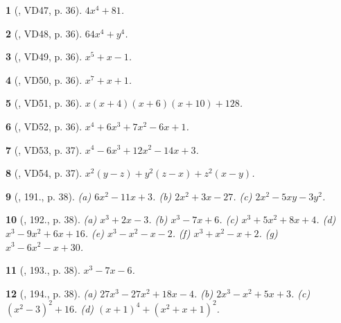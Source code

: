 \documentclass{article}
\newtheorem{baitoan}{}
\begin{document}
\begin{baitoan}[\cite{Binh_Toan_8_tap_1}, VD47, p. 36]
	$4x^4 + 81$.
\end{baitoan}

\begin{baitoan}[\cite{Binh_Toan_8_tap_1}, VD48, p. 36]
	$64x^4 + y^4$.
\end{baitoan}

\begin{baitoan}[\cite{Binh_Toan_8_tap_1}, VD49, p. 36]
	$x^5 + x - 1$.
\end{baitoan}

\begin{baitoan}[\cite{Binh_Toan_8_tap_1}, VD50, p. 36]
	$x^7 + x + 1$.
\end{baitoan}

\begin{baitoan}[\cite{Binh_Toan_8_tap_1}, VD51, p. 36]
	$x(x + 4)(x + 6)(x + 10) + 128$.
\end{baitoan}

\begin{baitoan}[\cite{Binh_Toan_8_tap_1}, VD52, p. 36]
	$x^4 + 6x^3 + 7x^2 - 6x + 1$.
\end{baitoan}

\begin{baitoan}[\cite{Binh_Toan_8_tap_1}, VD53, p. 37]
	$x^4 - 6x^3 + 12x^2 - 14x + 3$.
\end{baitoan}

\begin{baitoan}[\cite{Binh_Toan_8_tap_1}, VD54, p. 37]
	$x^2(y - z) + y^2(z - x) + z^2(x - y)$.
\end{baitoan}

\begin{baitoan}[\cite{Binh_Toan_8_tap_1}, 191., p. 38]
	(a) $6x^2 - 11x + 3$. (b) $2x^2 + 3x - 27$. (c) $2x^2 - 5xy - 3y^2$.
\end{baitoan}

\begin{baitoan}[\cite{Binh_Toan_8_tap_1}, 192., p. 38]
	(a) $x^3 + 2x - 3$. (b) $x^3 - 7x + 6$. (c) $x^3 + 5x^2 + 8x + 4$. (d) $x^3 - 9x^2 + 6x + 16$. (e) $x^3 - x^2 - x - 2$. (f) $x^3 + x^2 - x + 2$. (g) $x^3 - 6x^2 - x + 30$.
\end{baitoan}

\begin{baitoan}[\cite{Binh_Toan_8_tap_1}, 193., p. 38]
	$x^3 - 7x - 6$.
\end{baitoan}

\begin{baitoan}[\cite{Binh_Toan_8_tap_1}, 194., p. 38]
	(a) $27x^3 - 27x^2 + 18x - 4$. (b) $2x^3 - x^2 + 5x + 3$. (c) $(x^2 - 3)^2 + 16$. (d) $(x + 1)^4 + (x^2 + x + 1)^2$.
\end{baitoan}
\end{document}
